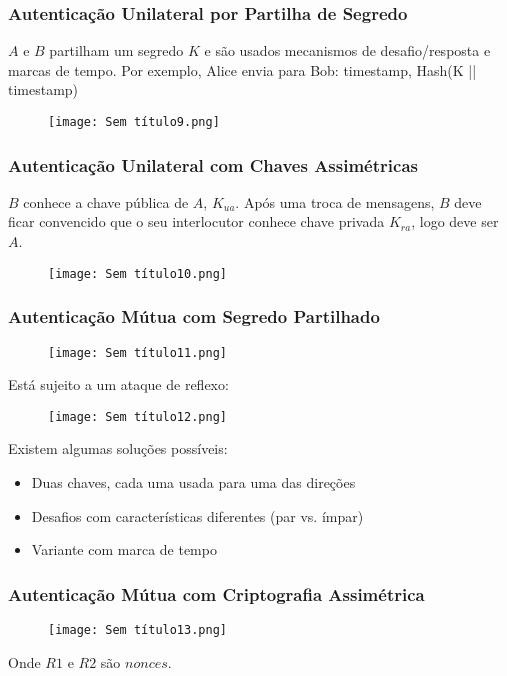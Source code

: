 \documentclass[10pt,a4paper]{report}
\begin{document}
\subsubsection{Autenticação Unilateral por Partilha de Segredo}
$A$ e $B$ partilham um segredo $K$ e são usados mecanismos de desafio/resposta e marcas de tempo. Por exemplo, Alice envia para Bob: timestamp, Hash(K || timestamp)
\begin{figure}[H]
\centering
\texttt{[image: Sem título9.png]}
\end{figure}
\subsubsection{Autenticação Unilateral com Chaves Assimétricas}
$B$ conhece a chave pública de $A$, $K_{ua}$. Após uma troca de mensagens, $B$ deve ficar convencido que o seu interlocutor conhece chave privada $K_{ra}$, logo deve ser $A$.
\begin{figure}[H]
\centering
\texttt{[image: Sem título10.png]}
\end{figure}
\subsubsection{Autenticação Mútua com Segredo Partilhado}
\begin{figure}[H]
\centering
\texttt{[image: Sem título11.png]}
\end{figure}
Está sujeito a um ataque de reflexo:
\begin{figure}[H]
\centering
\texttt{[image: Sem título12.png]}
\end{figure}
Existem algumas soluções possíveis:
\begin{itemize}
\item Duas chaves, cada uma usada para uma das direções
\item Desafios com características diferentes (par vs. ímpar)
\item Variante com marca de tempo
\end{itemize}
\subsubsection{Autenticação Mútua com Criptografia Assimétrica}
\begin{figure}[H]
\centering
\texttt{[image: Sem título13.png]}
\end{figure}
Onde $R1$ e $R2$ são $nonces$.
\end{document}
